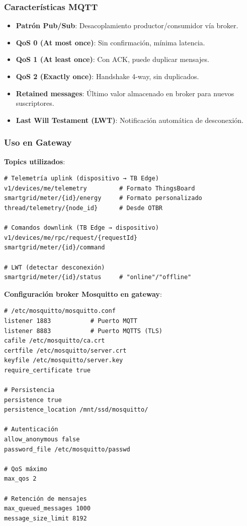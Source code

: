 \subsubsection{Características MQTT}

\begin{itemize}
    \item \textbf{Patrón Pub/Sub}: Desacoplamiento productor/consumidor vía broker.
    \item \textbf{QoS 0 (At most once)}: Sin confirmación, mínima latencia.
    \item \textbf{QoS 1 (At least once)}: Con ACK, puede duplicar mensajes.
    \item \textbf{QoS 2 (Exactly once)}: Handshake 4-way, sin duplicados.
    \item \textbf{Retained messages}: Último valor almacenado en broker para nuevos suscriptores.
    \item \textbf{Last Will Testament (LWT)}: Notificación automática de desconexión.
\end{itemize}

\subsubsection{Uso en Gateway}

\textbf{Topics utilizados}:
\begin{verbatim}
# Telemetría uplink (dispositivo → TB Edge)
v1/devices/me/telemetry         # Formato ThingsBoard
smartgrid/meter/{id}/energy     # Formato personalizado
thread/telemetry/{node_id}      # Desde OTBR

# Comandos downlink (TB Edge → dispositivo)
v1/devices/me/rpc/request/{requestId}
smartgrid/meter/{id}/command

# LWT (detectar desconexión)
smartgrid/meter/{id}/status     # "online"/"offline"
\end{verbatim}

\textbf{Configuración broker Mosquitto en gateway}:
\begin{verbatim}
# /etc/mosquitto/mosquitto.conf
listener 1883           # Puerto MQTT
listener 8883           # Puerto MQTTS (TLS)
cafile /etc/mosquitto/ca.crt
certfile /etc/mosquitto/server.crt
keyfile /etc/mosquitto/server.key
require_certificate true

# Persistencia
persistence true
persistence_location /mnt/ssd/mosquitto/

# Autenticación
allow_anonymous false
password_file /etc/mosquitto/passwd

# QoS máximo
max_qos 2

# Retención de mensajes
max_queued_messages 1000
message_size_limit 8192
\end{verbatim}

